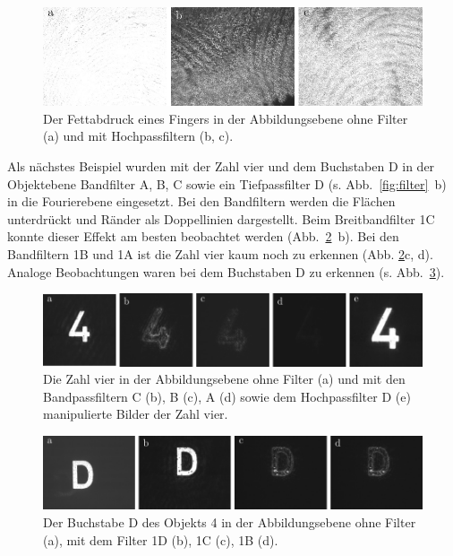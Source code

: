 \begin{figure}[h]
	\centering
	\includegraphics{images/ergebniss_Fingerab/abb.pdf}
	\caption[Bild eines Fettabdruck eines Fingers mit Filter bearbeitet]{
		Der Fettabdruck eines Fingers in der Abbildungsebene ohne Filter (a) und mit Hochpassfiltern (b, c).
	}
	\label{fig:example20_Hochpass}
\end{figure}

Als nächstes Beispiel wurden mit der Zahl vier und dem Buchstaben D in der Objektebene Bandfilter A, B, C  sowie ein Tiefpassfilter D (s. Abb.~\ref{fig:filter}~b) in die Fourierebene eingesetzt. Bei den Bandfiltern werden die Flächen unterdrückt und Ränder als Doppellinien dargestellt. Beim Breitbandfilter 1C konnte dieser Effekt am besten beobachtet werden (Abb.~\ref{fig:vier_mit_breitband}~b). Bei den Bandfiltern 1B und 1A ist die Zahl vier kaum noch zu erkennen (Abb. \ref{fig:vier_mit_breitband}c, d). Analoge Beobachtungen waren bei dem Buchstaben D zu erkennen (s. Abb.~\ref{fig:example10_D_filter}).

\begin{figure}[h]
	\centering
	\includegraphics{images/Regina/abb22.pdf}
	\caption[Bild der Zahl 4 mit Filtern bearbeitet]{
		Die Zahl vier in  der Abbildungsebene ohne Filter (a) und mit den Bandpassfiltern C (b), B (c), A (d) sowie dem Hochpassfilter D (e) manipulierte Bilder der Zahl vier.
	}
	\label{fig:vier_mit_breitband}
\end{figure}

\begin{figure}[h]
	\centering
	\includegraphics{images/ergebniss_D/abb.pdf}
	\caption[Bild des Buchstaben D mit Filtern bearbeitet]{
		Der Buchstabe D des Objekts 4 in der Abbildungsebene ohne Filter (a), mit dem Filter 1D (b), 1C (c), 1B (d).
	}
	\label{fig:example10_D_filter}
\end{figure}



